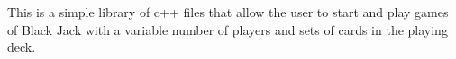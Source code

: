 This is a simple library of c++ files that allow the user to start and play games of Black Jack with a variable number of players and sets of cards in the playing deck. 